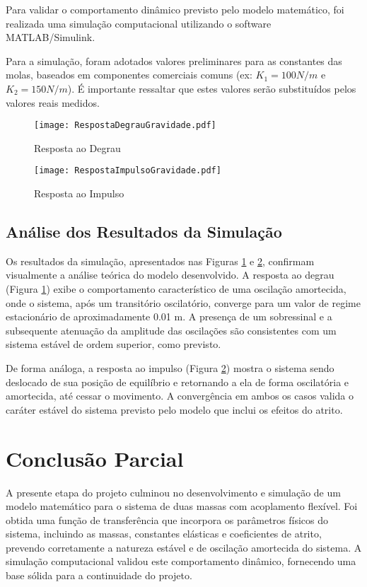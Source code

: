 \documentclass[9pt,a4paper,twocolumn,twoside]{tau-class/tau}
\begin{document}
Para validar o comportamento dinâmico previsto pelo modelo matemático, foi realizada uma simulação computacional utilizando o software MATLAB/Simulink.

Para a simulação, foram adotados valores preliminares para as constantes das molas, baseados em componentes comerciais comuns (ex: $K_1 = 100N/m$ e $K_2 = 150N/m$). É importante ressaltar que estes valores serão substituídos pelos valores reais medidos.

\begin{figure}[H]
    \centering
    \texttt{[image: RespostaDegrauGravidade.pdf]}
    \caption{Resposta ao Degrau}
    \label{fig:RDG}
\end{figure}

\begin{figure}[H]
    \centering
    \texttt{[image: RespostaImpulsoGravidade.pdf]}
    \caption{Resposta ao Impulso}
    \label{fig:RIG}
\end{figure}


\subsection{Análise dos Resultados da Simulação}
Os resultados da simulação, apresentados nas Figuras \ref{fig:RDG} e \ref{fig:RIG}, confirmam visualmente a análise teórica do modelo desenvolvido. A resposta ao degrau (Figura \ref{fig:RDG}) exibe o comportamento característico de uma oscilação amortecida, onde o sistema, após um transitório oscilatório, converge para um valor de regime estacionário de aproximadamente 0.01 m. A presença de um sobressinal e a subsequente atenuação da amplitude das oscilações são consistentes com um sistema estável de ordem superior, como previsto.

De forma análoga, a resposta ao impulso (Figura \ref{fig:RIG}) mostra o sistema sendo deslocado de sua posição de equilíbrio e retornando a ela de forma oscilatória e amortecida, até cessar o movimento. A convergência em ambos os casos valida o caráter estável do sistema previsto pelo modelo que inclui os efeitos do atrito.

\section{Conclusão Parcial}

 A presente etapa do projeto culminou no desenvolvimento e simulação de um modelo matemático para o sistema de duas massas com acoplamento flexível. Foi obtida uma função de transferência que incorpora os parâmetros físicos do sistema, incluindo as massas, constantes elásticas e coeficientes de atrito, prevendo corretamente a natureza estável e de oscilação amortecida do sistema. A simulação computacional validou este comportamento dinâmico, fornecendo uma base sólida para a continuidade do projeto.
\end{document}
